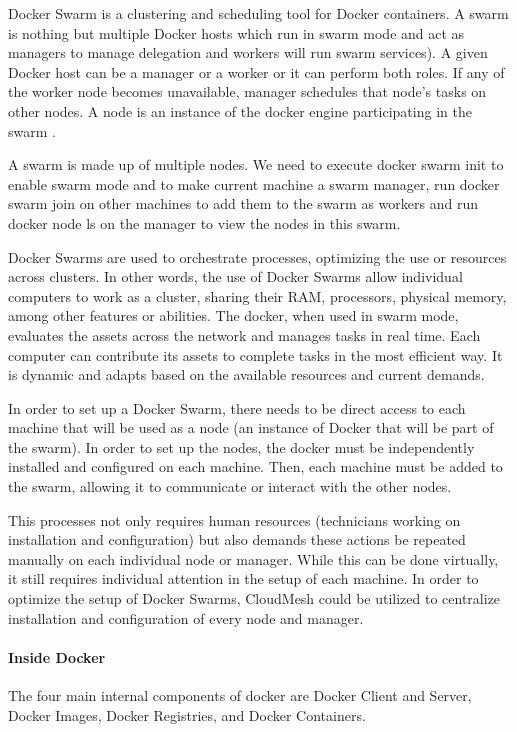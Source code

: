 \documentclass[sigconf]{acmart}
\begin{document}
	Docker Swarm is a clustering and scheduling tool for Docker containers. A swarm is nothing but multiple Docker hosts which run in swarm mode and act as managers to manage delegation and workers will run swarm services). A given Docker host can be a manager or a worker or it can perform both roles. If any of the worker node becomes unavailable, manager schedules that node’s tasks on other nodes. A node is an instance of the docker engine participating in the swarm \cite{dockerdoc2017}.
	
	A swarm is made up of multiple nodes. We need to execute docker swarm init to enable swarm mode and to make current machine a swarm manager,
	run docker swarm join on other machines to add them to the swarm as workers and run docker node ls on the manager to view the nodes in this swarm.
	
	Docker Swarms are used to orchestrate processes, optimizing the use or resources across clusters.  In other words, the use of Docker Swarms allow individual computers to work as a cluster, sharing their RAM, processors, physical memory, among other features or abilities.    The docker, when used in swarm mode, evaluates the assets across the network and manages tasks in real time. Each computer can contribute its assets to complete tasks in the most efficient way. It is dynamic and adapts based on the available resources and current demands.   
	
	In order to set up a Docker Swarm, there needs to be direct access to each machine that will be used as a node (an instance of Docker that will be part of the swarm).  In order to set up  the nodes, the docker must be independently installed and configured on each machine.  Then, each machine must be added to the swarm, allowing it to communicate or interact with the other nodes.  
	
	This processes not only requires human resources (technicians working on installation and configuration) but also demands these actions be repeated manually on each individual node or manager. While this can be done virtually, it still requires individual attention in the setup of each machine.  In order to optimize the setup of Docker Swarms, CloudMesh could be utilized to centralize installation and configuration of every node and manager.  
	
	
	\paragraph{Inside Docker}
	The four main internal components of docker are Docker Client and Server, Docker Images, Docker Registries, and Docker Containers.
\end{document}

